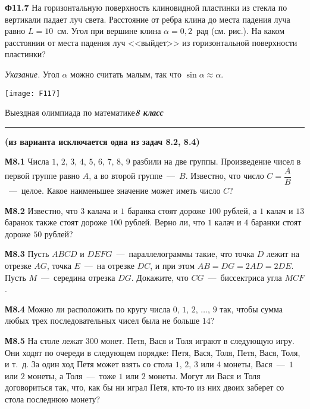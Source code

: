 \documentclass[12pt, a4paper, usenames]{article}
\begin{document}
\bigskip

\parbox[b][3cm][t]{145mm}{{\bf Ф11.7} На горизонтальную поверхность клиновидной пластинки из стекла по вертикали падает луч света. Расстояние от ребра клина до места падения луча равно $L=10$~см. Угол при вершине клина $\alpha = 0{,}2$~рад (см. рис.). На каком расстоянии от места падения луч <<выйдет>> из горизонтальной поверхности пластинки?


\textit{Указание.} Угол $\alpha$ можно считать малым, так что $\sin \alpha \approx \alpha$.}
\hfill
\parbox[b][3cm][t]{35mm}{
\texttt{[image: F117]}} 





\newpage
\begin{center}
Выездная олимпиада по математике\hfill\textit{\bf 8 класс}
\hrule\medskip
{\bf (из варианта исключается одна из задач 8.2, 8.4)}
\end{center}



{\bf М8.1} Числа $1$, $2$, $3$, $4$, $5$, $6$, $7$, $8$, $9$ разбили на две группы. Произведение чисел в первой группе равно $A$, а во второй группе~---~$B$. Известно, что число $C = \dfrac{A}{B}$~---~целое. Какое наименьшее значение может иметь число $C$? 

\bigskip

{\bf М8.2} Известно, что $3$ калача и $1$ баранка стоят дороже $100$ рублей, а $1$ калач и $13$ баранок также стоят дороже $100$ рублей. Верно ли, что $1$ калач и $4$ баранки стоят дороже $50$ рублей?

\bigskip

{\bf М8.3} Пусть $ABCD$ и $DEFG$~---~параллелограммы такие, что точка $D$ лежит на отрезке $AG$, точка $E$~---~на отрезке $DC$, и при этом $AB = DG = 2AD = 2DE$. Пусть $M$~---~середина отрезка $DG$. Докажите, что $CG$~---~биссектриса угла $MCF$.

\bigskip

{\bf М8.4} Можно ли расположить по кругу числа $0$, $1$, $2$, $\dotsc$, $9$ так, чтобы сумма любых трех последовательных чисел была не больше $14$?

\bigskip

{\bf М8.5} На столе лежат $300$ монет. Петя, Вася и Толя играют в следующую игру. Они ходят по очереди в следующем порядке: Петя, Вася, Толя, Петя, Вася, Толя, и т.~д. За один ход Петя может взять со стола $1$, $2$, $3$ или $4$ монеты, Вася~---~$1$ или $2$ монеты, а Толя~---~тоже $1$ или $2$ монеты. Могут ли Вася и Толя договориться так, что, как бы ни играл Петя, кто-то из них двоих заберет со стола последнюю монету? 
\end{document}
